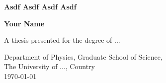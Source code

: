\begin{titlepage}
    \begin{center}
        \vspace*{1cm}

        \textbf{\LARGE Asdf Asdf Asdf Asdf}

        \vspace{0.5cm}

        \vspace{1.5cm}

        \textbf{\LARGE Your Name}

        \vfill

        \Large
        A thesis presented for the degree of ...


        Department of Physics, Graduate School of Science,\\
        The University of ..., Country\\
        \today

    \end{center}
 \end{titlepage}
